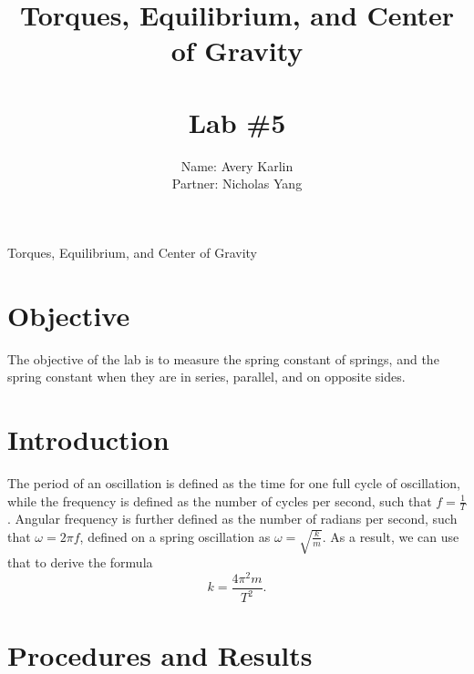 \documentclass[11pt, titlepage]{article}
\title{Torques, Equilibrium, and Center of Gravity\\ \ \\ \large Lab \#5}
\author{Name: Avery Karlin \\ Partner: Nicholas Yang}
\date{}
\begin{document}
\maketitle

\begin{center}
\LARGE Torques, Equilibrium, and Center of Gravity
\end{center}

\section*{Objective}
The objective of the lab is to measure the spring constant of springs, and the spring constant when they are in series, parallel, and on opposite sides.

\section*{Introduction}
The period of an oscillation is defined as the time for one full cycle of oscillation, while the frequency is defined as the number of cycles per second, such that $f = \frac{1}{T}$. Angular frequency is further defined as the number of radians per second, such that $\omega = 2\pi f$, defined on a spring oscillation as $\omega = \sqrt{\frac{k}{m}}$. As a result, we can use that to derive the formula $$k = \frac{4\pi^2m}{T^2}.$$

\section*{Procedures and Results}
\end{document}
